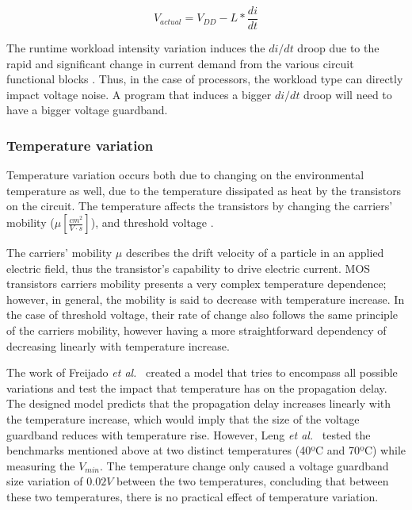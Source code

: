 \begin{equation}
    \label{eq:Vactual}
    V_{actual} = V_{DD}-L*\frac{di}{dt}
\end{equation}

The runtime workload intensity variation induces the $di/dt$ droop due to the rapid and significant change in current demand from the various circuit functional blocks \cite{thomas_core_2016}. Thus, in the case of processors, the workload type can directly impact voltage noise. A program that induces a bigger $di/dt$ droop will need to have a bigger voltage guardband.

\subsubsection{Temperature variation}

Temperature variation occurs both due to changing on the environmental temperature as well, due to the temperature dissipated as heat by the transistors on the circuit. The temperature affects the transistors by changing the carriers' mobility ($ \mu [\frac{cm^2}{V\cdot s}]$), and threshold voltage \cite{wolpert_temperature_2012}.

The carriers' mobility $ \mu $ describes the drift velocity of a particle in an applied electric field, thus the transistor's capability to drive electric current. MOS transistors carriers mobility presents a very complex temperature dependence; however, in general, the mobility is said to decrease with temperature increase. In the case of threshold voltage, their rate of change also follows the same principle of the carriers mobility, however having a more straightforward dependency of decreasing linearly with temperature increase.

The work of Freijado \textit{et al.}~\cite{freijedo_modeling_2012} created a model that tries to encompass all possible variations and test the impact that temperature has on the propagation delay. The designed model predicts that the propagation delay increases linearly with the temperature increase, which would imply that the size of the voltage guardband reduces with temperature rise. However, Leng \textit{et al.}~\cite{leng_safe_2015} tested the benchmarks mentioned above at two distinct temperatures (40ºC and 70ºC) while measuring the $V_{min}$. The temperature change only caused a voltage guardband size variation of $0.02V$ between the two temperatures, concluding that between these two temperatures, there is no practical effect of temperature variation. 

